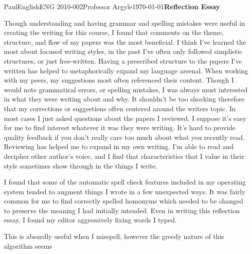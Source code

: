\documentclass[12pt,letterpaper]{article}
\begin{document}
\begin{mla}{Paul}{English}{ENG 2010-002}{Professor Argyle}{\today}{\textbf{Reflection Essay}}



Though understanding and having grammar and spelling mistakes were useful in creating the writing for this course, I found that comments on the theme, structure, and flow of my papers was the most beneficial.
I think I've learned the most about focused writing styles, in the past I've often only followed simplistic structures, or just free-written. Having a prescribed structure to the papers I've written has helped to metaphorically expand my language arsenal.
When working with my peers, my suggestions most often referenced their content. Though I would note grammatical errors, or spelling mistakes, I was always most interested in what they were writing about and why. It shouldn't be too shocking therefore that my corrections or suggestions often centered around the writers topic. In most cases I just asked questions about the papers I reviewed.
I suppose it's easy for me to find interest whatever it was they were writing. It's hard to provide quality feedback if you don't really care too much about what you recently read.
Reviewing has helped me to expand in my own writing. I'm able to read and decipher other author's voice, and I find that characteristics that I value in their style sometimes show through in the things I write.

I found that some of the automatic spell check features included in my operating system tended to augment things I wrote in a few unexpected ways. It was fairly common for me to find correctly spelled homonyms which needed to be changed to preserve the meaning I had initially intended. Even in writing this reflection essay, I found my editor aggressively fixing words I typed.

This is absurdly useful when I misspell, however the greedy nature of this algorithm seems


\end{mla}
\end{document}
